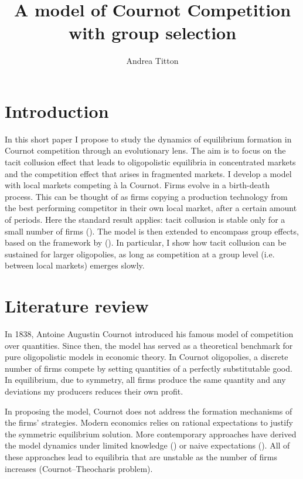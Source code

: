 \documentclass[american]{scrartcl}
\title{A model of Cournot Competition with group selection}
\author{Andrea Titton}
\newcommand{\citein}[1]{\citeauthor{#1} (\citeyear{#1})}
\begin{document}

\maketitle

\section{Introduction}


In this short paper I propose to study the dynamics of equilibrium formation in Cournot competition through an evolutionary lens. The aim is to focus on the tacit collusion effect that leads to oligopolistic equilibria in concentrated markets and the competition effect that arises in fragmented markets. I develop a model with local markets competing à la Cournot. Firms evolve in a birth-death process. This can be thought of as firms copying a production technology from the best performing competitor in their own local market, after a certain amount of periods. Here the standard result applies: tacit collusion is stable only for a small number of firms (\cite{Lampart2012}). The model is then extended to encompass group effects, based on the framework by \citein{Akdeniz2020}. In particular, I show how tacit collusion can be sustained for larger oligopolies, as long as competition at a group level (i.e. between local markets) emerges slowly.

\section{Literature review}

In 1838, Antoine Augustin Cournot introduced his famous model of competition over quantities. Since then, the model has served as a theoretical benchmark for pure oligopolistic models in economic theory. In Cournot oligopolies, a discrete number of firms compete by setting quantities of a perfectly substitutable good. In equilibrium, due to symmetry, all firms produce the same quantity and any deviations my producers reduces their own profit.

In proposing the model, Cournot does not address the formation mechanisms of the firms' strategies. Modern economics relies on rational expectations to justify the symmetric equilibrium solution. More contemporary approaches have derived the model dynamics under limited knowledge (\cite{Bischi2015}) or naive expectations (\cite{Cnovas2008}). All of these approaches lead to equilibria that are unstable as the number of firms increases (Cournot–Theocharis problem).
\end{document}
